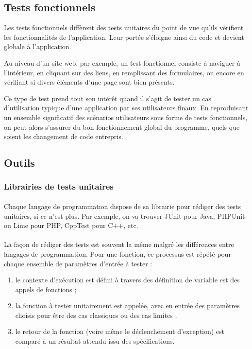 \subsection{Tests fonctionnels}

Les tests fonctionnels diffèrent des tests unitaires du point de vue qu'ils vérifient les fonctionnalités de l'application.
Leur portée s'éloigne ainsi du code et devient globale à l'application.

Au niveau d'un site web, par exemple, un test fonctionnel consiste à naviguer à l'intérieur, en cliquant sur des liens, en remplissant des formulaires, ou encore en vérifiant si divers éléments d'une page sont bien présents.

Ce type de test prend tout son intérêt quand il s'agit de tester un cas d'utilisation typique d'une application par ses utilisateurs finaux.
En reproduisant un ensemble significatif des scénarios utilisateurs sous forme de tests fonctionnels, on peut alors s'assurer du bon fonctionnement global du programme, quels que soient les changement de code entrepris.



\subsection{Outils}

\subsubsection{Librairies de tests unitaires}

\paragraph{}
Chaque langage de programmation dispose de sa librairie pour rédiger des tests unitaires, si ce n'est plus.
Par exemple, on va trouver JUnit pour Java, PHPUnit ou Lime pour PHP, CppTest pour C++, etc.

\paragraph{}
La façon de rédiger des tests est souvent la même malgré les différences entre langages de programmation.
Pour une fonction, ce processus est répété pour chaque ensemble de paramètres d'entrée à tester :

\begin{enumerate}
	\item le contexte d'exécution est défini à travers des définition de variable est des appels de fonctions ;
	\item la fonction à tester unitairement est appelée, avec en entrée des paramètres choisis pour être des cas classiques ou des cas limites ;
	\item le retour de la fonction (voire même le déclenchement d'exception) est comparé à un résultat attendu issu des spécifications.
\end{enumerate}

